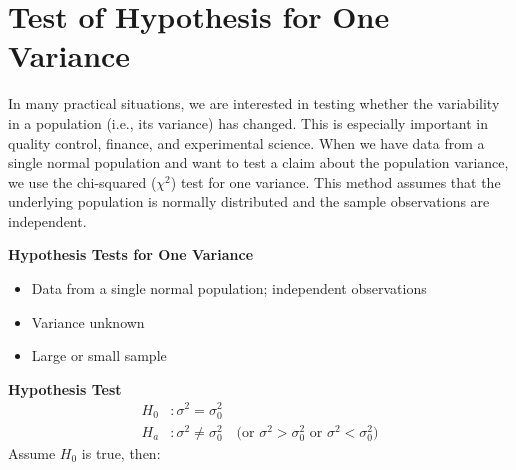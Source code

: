 \section{Test of Hypothesis for One Variance}

In many practical situations, we are interested in testing whether the variability in a population (i.e., its variance) has changed. This is especially important in quality control, finance, and experimental science. When we have data from a single normal population and want to test a claim about the population variance, we use the chi-squared ($\chi^2$) test for one variance. This method assumes that the underlying population is normally distributed and the sample observations are independent.

\vspace{1em}
\textbf{Hypothesis Tests for One Variance}

\begin{itemize}
  \item Data from a single normal population; independent observations
  \item Variance unknown
  \item Large or small sample
\end{itemize}

\textbf{Hypothesis Test} \\
\begin{align*}
H_0 &: \sigma^2 = \sigma_0^2 \\
H_a &: \sigma^2 \ne \sigma_0^2 \quad \text{(or } \sigma^2 > \sigma_0^2 \text{ or } \sigma^2 < \sigma_0^2\text{)}
\end{align*}
Assume $H_0$ is true, then:

